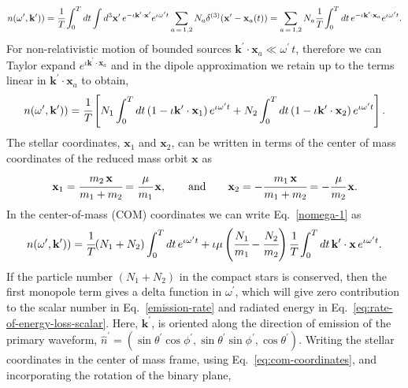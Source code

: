 \documentclass[aps,prd]{revtex4-2}
\begin{document}
\begin{eqnarray}\label{dipole-number-1}
    n(\omega^{\prime},\mathbf{k}^\prime)) = \cfrac{1}{T} \int_{0}^{T}dt \int d^{3}\mathbf{x}^\prime\, e^{-\iota \mathbf{k}^{\prime} \cdot \mathbf{x}^\prime} e^{\iota \omega^{\prime} t} \sum_{a\,=\, 1, 2}  N_{a} \delta^{(3)}(\mathbf{x}^\prime - \mathbf{x}_{a}(t))
    = \sum_{a\, =\, 1, 2} N_{a} \cfrac{1}{T} \int_{0}^{T} dt \, e^{-\iota \mathbf{k}^{\prime}\cdot\mathbf{x}_{a}}  e^{\iota \omega^{\prime} t}.
\end{eqnarray}
For non-relativistic motion of bounded sources $\mathbf{k}^{\prime}\cdot\mathbf{x}_{a} \ll \omega^{\prime}\, t$, therefore we can Taylor expand $e^{\iota \mathbf{k}^{\prime} \cdot\mathbf{x}_{a}}$ and in the dipole approximation we retain up to  the terms linear in $\mathbf{k}^{\prime} \cdot \mathbf{x}_{a}$ to obtain,
\begin{eqnarray}\label{nomega-1}
    n(\omega^{\prime},\mathbf{k}^\prime))
    = \cfrac{1}{T}  \left[ N_1 \int_{0}^{T} dt\left( 1 - \iota \mathbf{k}^{\prime} \cdot \mathbf{x}_{1} \right) e^{\iota \omega^{\prime} t } + N_{2} \int_{0}^{T} dt\left( 1 - \iota \mathbf{k}^{\prime} \cdot \mathbf{x}_{2} \right) e^{\iota \omega^{\prime} t } \right].
\end{eqnarray}
The stellar coordinates, $\mathbf{x}_1$ and $\mathbf{x}_2$, can be written in terms of the center of mass coordinates of the reduced mass orbit $\mathbf{x}$ as 
\begin{eqnarray}\label{eq:com-coordinates}
    \mathbf{x}_{1} = \cfrac{m_{2}\,\mathbf{x}}{m_{1}+m_{2}} = \cfrac{\mu}{m_{1}}\,\mathbf{x}, \qquad\text{and}\qquad \mathbf{x}_{2} = - \cfrac{m_{1}\,\mathbf{x}}{m_{1}+m_{2}} = - \cfrac{\mu}{m_{2}}\,\mathbf{x}.
\end{eqnarray}
In the center-of-mass (COM) coordinates we can write Eq.~\eqref{nomega-1} as
\begin{eqnarray}\label{nomega-2}
    n(\omega^{\prime},\mathbf{k}^\prime))  = \cfrac{1}{T} (N_{1} + N_{2})\int_{0}^{T} dt\,e^{\iota \omega^{\prime} t } + \iota \mu \left( \cfrac{N_{1}}{m_{1}} - \cfrac{N_{2}}{m_{2}} \right)  \cfrac{1}{T} \int_{0}^{T} dt\,\mathbf{k}^{\prime} \cdot \mathbf{x}\,e^{\iota \omega^{\prime} t }.
\end{eqnarray}
If the particle number $(N_1+N_2)$ in the compact stars is conserved, then the first monopole term gives a delta function in $\omega^{\prime}$, which will give zero contribution to the scalar number in Eq.~\eqref{emission-rate} and radiated energy in Eq.~\eqref{eq:rate-of-energy-loss-scalar}. Here, $\mathbf{k}^{\prime}$, is oriented along the direction of emission of the primary waveform, $\hat{n}^\prime = (\sin{\theta^{\prime}} \cos{\phi^{\prime}}, \sin{\theta^{\prime}} \sin{\phi^{\prime}}, \cos{\theta^{\prime}} )$. Writing the stellar coordinates in the center of mass frame, using Eq.~\eqref{eq:com-coordinates}, and incorporating the rotation of the binary plane,
\end{document}
